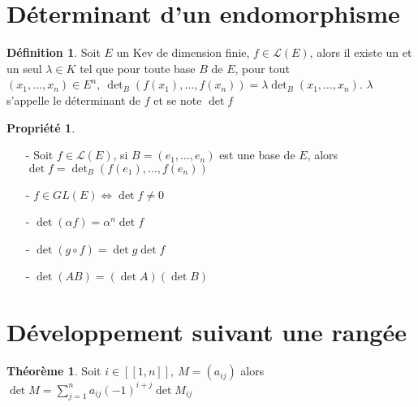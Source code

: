 \documentclass[fleqn]{article}
\theoremstyle{definition} \newtheorem*{defi}{D\'efinition}
\theoremstyle{definition} \newtheorem*{theo}{Th\'eor\`eme}
\theoremstyle{definition} \newtheorem*{coro}{Corollaire}
\theoremstyle{definition} \newtheorem*{nota}{Notation}
\theoremstyle{definition} \newtheorem*{vocab}{Vocabulaire}
\theoremstyle{remark} \newtheorem*{rqs}{Remarques}
\theoremstyle{definition} \newtheorem*{prop}{Propri\'et\'e}
\begin{document}
\section{D\'eterminant d'un endomorphisme}
\begin{defi}
	Soit $E$ un Kev de dimension finie, $f \in \mathscr{L}(E)$, alors il existe un et un seul $\lambda \in K$ tel que pour toute base $B$ de $E$,
	pour tout $(x_1, \hdots, x_n) \in E^n,\ \det_B(f(x_1), \hdots, f(x_n)) = \lambda \det_B(x_1, \hdots, x_n)$. $\lambda$ s'appelle le
	d\'eterminant de $f$ et se note $\det f$
\end{defi}

\begin{prop} $ $
	\begin{enumerate}
		\item [-] Soit $f \in \mathscr{L}(E)$, si $B = (e_1, \hdots, e_n)$ est une base de $E$, alors $\det f = \det_B (f(e_1), \hdots, f(e_n))$
		\item [-] $f \in GL(E) \Leftrightarrow \det f \neq 0$
		\item [-] $\det (\alpha f) = \alpha^n \det f$
		\item [-] $\det (g \circ f) = \det g \det f$
		\item [-] $\det (AB) = (\det A) (\det B)$
	\end{enumerate}
\end{prop}

\section{D\'eveloppement suivant une rang\'ee}
\begin{theo}
	Soit $i \in [\![1,n]\!],\ M = (a_{ij})$ alors $\det M = \sum_{j=1}^n a_{ij}(-1)^{i+j} \det M_{ij}$
\end{theo}
\end{document}
